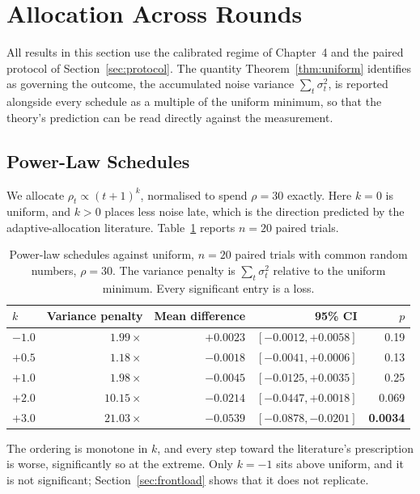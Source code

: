 \section{Allocation Across Rounds}
\label{sec:results-alloc}

All results in this section use the calibrated regime of
Chapter~4 and the paired protocol of Section~\ref{sec:protocol}. The
quantity Theorem~\ref{thm:uniform} identifies as governing the outcome,
the accumulated noise variance $\sum_t\sigma_t^2$, is reported alongside every
schedule as a multiple of the uniform minimum, so that the theory's prediction
can be read directly against the measurement.

\subsection{Power-Law Schedules}

We allocate $\rho_t \propto (t+1)^{k}$, normalised to spend $\rho=30$ exactly.
Here $k=0$ is uniform, and $k>0$ places less noise late, which is the direction
predicted by the adaptive-allocation literature. Table~\ref{tab:headroom}
reports $n=20$ paired trials.

\begin{table}[H]
\centering
\caption{Power-law schedules against uniform, $n=20$ paired trials with common
random numbers, $\rho=30$. The variance penalty is $\sum_t\sigma_t^2$ relative
to the uniform minimum. Every significant entry is a loss.}
\label{tab:headroom}
\begin{tabular}{lrrrr}
\toprule
$k$ & Variance penalty & Mean difference & 95\% CI & $p$ \\
\midrule
$-1.0$ & $1.99\times$ & $+0.0023$ & $[-0.0012,+0.0058]$ & 0.19 \\
$+0.5$ & $1.18\times$ & $-0.0018$ & $[-0.0041,+0.0006]$ & 0.13 \\
$+1.0$ & $1.98\times$ & $-0.0045$ & $[-0.0125,+0.0035]$ & 0.25 \\
$+2.0$ & $10.15\times$ & $-0.0214$ & $[-0.0447,+0.0018]$ & 0.069 \\
$+3.0$ & $21.03\times$ & $-0.0539$ & $[-0.0878,-0.0201]$ & \textbf{0.0034} \\
\bottomrule
\end{tabular}
\end{table}

The ordering is monotone in $k$, and every step toward the literature's
prescription is worse, significantly so at the extreme. Only $k=-1$ sits above
uniform, and it is not significant; Section~\ref{sec:frontload} shows that it
does not replicate.

